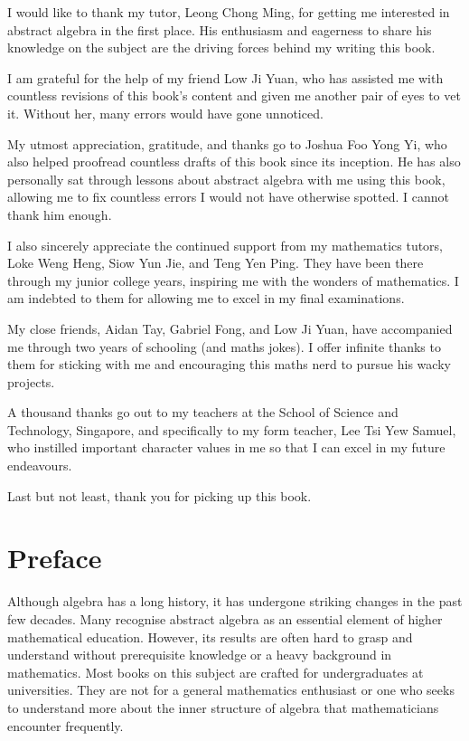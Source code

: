 I would like to thank my tutor, Leong Chong Ming, for getting me interested in abstract algebra in the first place. His enthusiasm and eagerness to share his knowledge on the subject are the driving forces behind my writing this book.

I am grateful for the help of my friend Low Ji Yuan, who has assisted me with countless revisions of this book's content and given me another pair of eyes to vet it. Without her, many errors would have gone unnoticed.

My utmost appreciation, gratitude, and thanks go to Joshua Foo Yong Yi, who also helped proofread countless drafts of this book since its inception. He has also personally sat through lessons about abstract algebra with me using this book, allowing me to fix countless errors I would not have otherwise spotted. I cannot thank him enough.

I also sincerely appreciate the continued support from my mathematics tutors, Loke Weng Heng, Siow Yun Jie, and Teng Yen Ping. They have been there through my junior college years, inspiring me with the wonders of mathematics. I am indebted to them for allowing me to excel in my final examinations.

My close friends, Aidan Tay, Gabriel Fong, and Low Ji Yuan, have accompanied me through two years of schooling (and maths jokes). I offer infinite thanks to them for sticking with me and encouraging this maths nerd to pursue his wacky projects.

A thousand thanks go out to my teachers at the School of Science and Technology, Singapore, and specifically to my form teacher, Lee Tsi Yew Samuel, who instilled important character values in me so that I can excel in my future endeavours.

Last but not least, thank you for picking up this book.

\chapter{Preface}
Although algebra has a long history, it has undergone striking changes in the past few decades. Many recognise abstract algebra as an essential element of higher mathematical education. However, its results are often hard to grasp and understand without prerequisite knowledge or a heavy background in mathematics. Most books on this subject are crafted for undergraduates at universities. They are not for a general mathematics enthusiast or one who seeks to understand more about the inner structure of algebra that mathematicians encounter frequently.

